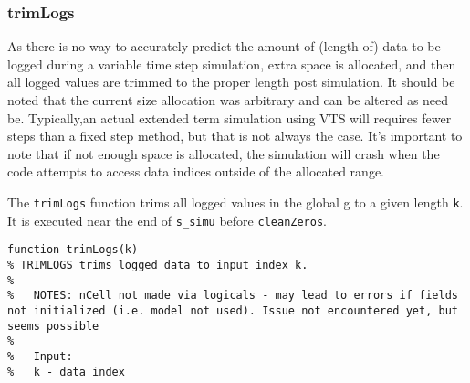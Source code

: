 \subsubsection{trimLogs}  
As there is no way to accurately predict the amount of (length of) data to be logged during a variable time step simulation, extra space is allocated, and then all logged values are trimmed to the proper length post simulation.
It should be noted that the current size allocation was arbitrary and can be altered as need be.
Typically,an actual extended term simulation using VTS will requires fewer steps than a fixed step method, but that is not always the case.
It's important to note that if not enough space is allocated, the simulation will crash when the code attempts to access data indices outside of the allocated range.

The \verb|trimLogs| function trims all logged values in the global g to a given length \verb|k|.
It is executed near the end of \verb|s_simu| before \verb|cleanZeros|.


\begin{verbatim}
function trimLogs(k)
% TRIMLOGS trims logged data to input index k.
%
%   NOTES: nCell not made via logicals - may lead to errors if fields not initialized (i.e. model not used). Issue not encountered yet, but seems possible
%
%   Input:
%   k - data index
\end{verbatim} 

